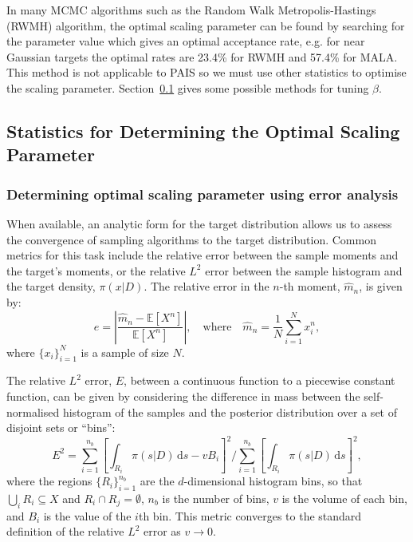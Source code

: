 \documentclass[final]{siamltex}
\begin{document}
In many MCMC algorithms such as the Random Walk Metropolis-Hastings
(RWMH) algorithm, the optimal scaling parameter can be found by
searching for the parameter value which gives an optimal acceptance
rate, e.g. for near Gaussian targets the optimal rates are 23.4\% for
RWMH and 57.4\% for MALA\cite{roberts2001optimal}. This method
is not applicable to PAIS so we must use other statistics to optimise
the scaling parameter. Section~\ref{sec:statistics} gives some
possible methods for tuning $\beta$.

\subsection{Statistics for Determining the Optimal Scaling Parameter}\label{sec:statistics}

\subsubsection{Determining optimal scaling parameter using error analysis}


When available, an analytic form for the target distribution allows us
to assess the convergence of sampling algorithms to the target
distribution. Common metrics for this task include the relative error
between the sample moments and the target's moments, or the
relative $L^2$ error between the sample histogram and the target
density, $\pi(x|D)$. The relative error in the $n$-th moment,
$\hat{m}_n$, is given by:
\begin{equation}\label{eq:34567}
	e = \left|\frac{\hat{m}_n - \mathbb{E}[X^n]}{\mathbb{E}[X^n]}\right|, \quad \text{where} \quad \hat{m}_n = \frac{1}{N}\sum_{i=1}^N \! x_i^n,
\end{equation}
where $\{x_i\}_{i=1}^N$ is a sample of size $N$.

The relative $L^2$ error, $E$, between a continuous function to a
piecewise constant function, can be given by considering the
difference in mass between the self-normalised histogram of the
samples and the posterior distribution over a set of disjoint sets or
``bins'':
\begin{equation}\label{eqn:L2_error}
	E^2 = \sum\limits_{i=1}^{n_b}\left[\displaystyle\int_{R_i} \! \pi(s|D) \, \mbox{d}s - vB_i\right]^2 \Big/ \sum\limits_{i=1}^{n_b}\left[\displaystyle\int_{R_i} \! \pi(s|D) \, \mbox{d}s\right]^2,
\end{equation}
where the regions $\{R_i\}_{i=1}^{n_b}$ are the $d$-dimensional
histogram bins, so that $\bigcup_i R_i \subseteq X$ and
$R_i\cap R_j=\emptyset$, $n_b$ is the number of bins, $v$ is the
volume of each bin, and $B_i$ is the value of the $i$th bin. This
metric converges to the standard definition of the relative $L^2$
error as $v\rightarrow 0$.
\end{document}
